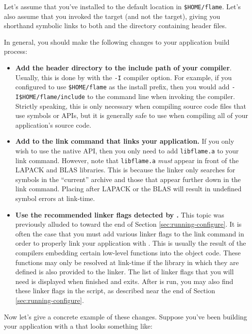 Let's assume that you've installed \libflame to the default location in
{\tt \$HOME/flame}.
Let's also assume that you invoked the \install target (and not the
\installwithoutsymlinks target), giving
you shorthand symbolic links to both \libflame and the directory containing
header files.

In general, you should make the following changes to your application build
process:
\begin{itemize}
\item
{\bf Add the \libflame header directory to the include path of your compiler}.
Usually, this is done by with the {\tt -I} compiler option.
For example, if you configured \libflame to use {\tt \$HOME/flame} as the
install prefix, then you would add {\tt -I\$HOME/flame/include} to the command
line when invoking the compiler.
Strictly speaking, this is only necessary when compiling source code files
that use \libflame symbols or APIs, but it is generally safe to use when compiling
all of your application's source code.
\item
{\bf Add \libflame to the link command that links your application.}
If you only wish to use the native \libflame API, then you only need to add
{\tt libflame.a} to your link command.
However, note that {\tt libflame.a} {\em must} appear in front of the
LAPACK and BLAS libraries.
This is because the linker only searches for symbols in the ``current''
archive and those that appear further down in the link command.
Placing \libflame after LAPACK or the BLAS will result in undefined symbol
errors at link-time.
\item
{\bf Use the recommended linker flags detected by \configurens.}
This topic was previously alluded to toward the end of Section
\ref{sec:running-configure}.
It is often the case that you must add various linker flags to the link
command in order to properly link your application with \libflamens.
This is usually the result of the compilers embedding certain low-level
functions into the object code.
These functions may only be resolved at link-time if the library in which
they are defined is also provided to the linker.
The list of linker flags that you will need is displayed when \configure
finished and exits.
After \configure is run, you may also find these linker flags in the
\postconfigure script, as described near the end of
Section \ref{sec:running-configure}.
\end{itemize}

Now let's give a concrete example of these changes.
Suppose you've been building your application with a \makefile that looks
something like:

